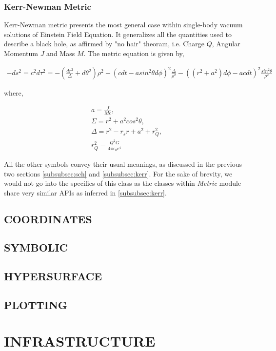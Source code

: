 \documentclass{aastex63}
\begin{document}
\subsubsection{Kerr-Newman Metric}\label{subsubsec:kerrnewman}
Kerr-Newman metric presents the most general case within single-body vacuum solutions of Einstein Field Equation. It generalizes all the quantities used to describe a black hole, as affirmed by "no hair" theoram, i.e. Charge $Q$, Angular Momentum $J$ and Mass $M$. The metric equation is given by,

\begin{gather}
-ds^2 = c^2 d\tau^2 = -(\frac{dr^2}{\Delta}+d\theta^2)\rho^2 + (c dt - a sin^2 \theta d\phi)^2 \frac{\Delta}{\rho^2} - ((r^2 + a^2)d\phi - ac dt)^2 \frac{sin^2 \theta}{\rho^2}
\end{gather}

where,

\begin{gather}
a = \frac{J}{Mc}, \nonumber \\
\Sigma = r^2 + a^2 cos^2 \theta , \nonumber  \\
\Delta  = r^2 - r_s r + a^2 + r_Q ^ 2, \nonumber \\
r_Q ^ 2 = \frac{Q^2 G}{4\pi\epsilon_0 c^4} \nonumber
\end{gather}

All the other symbols convey their usual meanings, as discussed in the previous two sections \ref{subsubsec:sch} and \ref{subsubsec:kerr}. For the sake of brevity, we would not go into the specifics of this class as the classes within \textit{Metric} module share very similar APIs as inferred in \ref{subsubsec:kerr}.

\subsection{COORDINATES}
\subsection{SYMBOLIC}
\subsection{HYPERSURFACE}
\subsection{PLOTTING}

\section{INFRASTRUCTURE} \label{sec:INFRASTRUCTURE}
\end{document}
